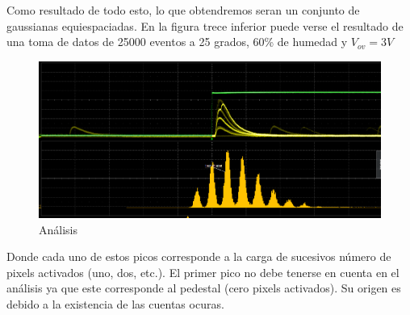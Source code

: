Como resultado de todo esto, lo que obtendremos seran un conjunto de gaussianas equiespaciadas. En la figura trece inferior puede verse el resultado de una toma de datos de 25000 eventos a 25 grados, 60\% de humedad y $V_{ov}=3V$

\begin{figure}[hbtp]
 \centering
 \includegraphics[scale=0.4]{Analisis.png}
 \caption{Análisis}
 \end{figure}

Donde cada uno de estos picos corresponde a la carga de sucesivos número de pixels activados (uno, dos, etc.). El primer pico no debe tenerse en cuenta en el análisis ya que este corresponde al pedestal (cero pixels activados). Su origen es debido a la existencia de las cuentas ocuras.
 
